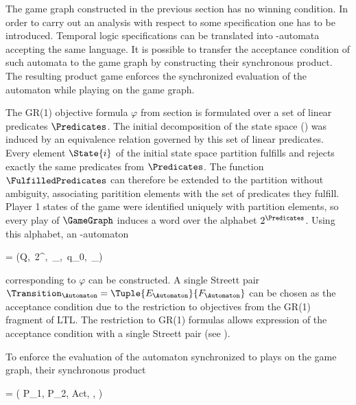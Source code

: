 The game graph constructed in the previous section has no winning condition.
In order to carry out an analysis with respect to some specification one has to be introduced.
Temporal logic specifications can be translated into \omega-automata accepting the same language.
It is possible to transfer the acceptance condition of such automata to the game graph by constructing their synchronous product.
The resulting product game enforces the synchronized evaluation of the automaton while playing on the game graph.


\startsubsection[title={Objective Automaton},reference=sec:abstraction-product-automaton]

    The GR(1) objective formula $\varphi$ from section  is formulated over a set of linear predicates $\Predicates$.
    The initial decomposition of the state space () was induced by an equivalence relation governed by this set of linear predicates.
    Every element $\State{i}$ of the initial state space partition fulfills and rejects exactly the same predicates from $\Predicates$.
    The function $\FulfilledPredicates$ can therefore be extended to the partition without ambiguity, associating paritition elements with the set of predicates they fulfill.
    Player 1 states of the game were identified uniquely with partition elements, so every play of $\GameGraph$ induces a word over the alphabet $2^\Predicates$.
    Using this alphabet, an \omega-automaton

    \startformula
        \Automaton = (Q,\, 2^\Predicates,\, \Transition_\Automaton,\, q_0,\, \Condition_\Automaton)
    \stopformula

    corresponding to $\varphi$ can be constructed.
    A single Streett pair $\Transition_\Automaton = \Tuple{E_\Automaton}{F_\Automaton}$ can be chosen as the acceptance condition due to the restriction to objectives from the GR(1) fragment of LTL.
    The restriction to GR(1) formulas allows expression of the acceptance condition with a single Streett pair (see ).

\stopsubsection


\startsubsection[title={Synchronized Product},reference=sec:abstraction-product-product]

    To enforce the evaluation of the automaton synchronized to plays on the game graph, their synchronous product

    \startformula
        \ProductGame = ( P_1, P_2, Act, \Transition, \Condition )
    \stopformula

